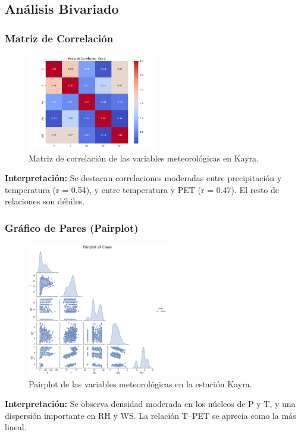 \subsection{Análisis Bivariado}

\subsubsection*{Matriz de Correlación}
\begin{figure}[H]
\centering
\includegraphics[width=0.5\textwidth]{resultados/por_estacion_meteorologica/Kayra/matriz_correlacion.png}
\caption{Matriz de correlación de las variables meteorológicas en Kayra.}
\label{fig:kayra_corr}
\end{figure}
\textbf{Interpretación:} Se destacan correlaciones moderadas entre precipitación y temperatura (r = 0.54), y entre temperatura y PET (r = 0.47). El resto de relaciones son débiles.

\subsubsection*{Gráfico de Pares (Pairplot)}
\begin{figure}[H]
\centering
\includegraphics[width=0.55\textwidth]{resultados/por_estacion_meteorologica/Kayra/pairplot.png}
\caption{Pairplot de las variables meteorológicas en la estación Kayra.}
\label{fig:kayra_pairplot}
\end{figure}
\textbf{Interpretación:} Se observa densidad moderada en los núcleos de P y T, y una dispersión importante en RH y WS. La relación T–PET se aprecia como la más lineal.


